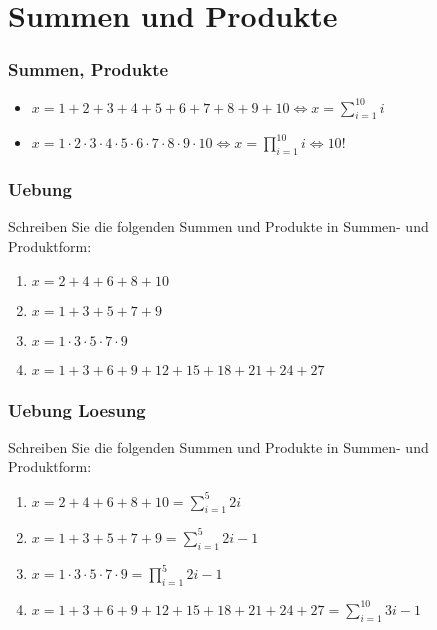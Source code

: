 \section{Summen und Produkte}
\begin{frame}
    \frametitle{Summen, Produkte}
    \begin{itemize}
        \item $x = 1+2+3+4+5+6+7+8+9+10 \iff x = \sum_{i=1}^{10} i$
        \item $x = 1 \cdot 2 \cdot 3 \cdot 4 \cdot 5 \cdot 6 \cdot 7 \cdot 8 \cdot 9 \cdot 10 \iff x = \prod_{i=1}^{10} i \iff 10!$
    \end{itemize}
\end{frame}

\begin{frame}
    \frametitle{Uebung}
    Schreiben Sie die folgenden Summen und Produkte in Summen- und Produktform:
    \begin{enumerate}
        \item $x = 2+4+6+8+10$
        \item $x = 1+3+5+7+9$
        \item $x = 1 \cdot 3 \cdot 5 \cdot 7 \cdot 9$
        \item $x = 1+3+6+9+12+15+18+21+24+27$
    \end{enumerate}
\end{frame}

\begin{frame}
    \frametitle{Uebung Loesung}
    Schreiben Sie die folgenden Summen und Produkte in Summen- und Produktform:
    \begin{enumerate}
        \item $x = 2+4+6+8+10 = \sum_{i=1}^{5} 2i$
        \item $x = 1+3+5+7+9 = \sum_{i=1}^{5} 2i-1$
        \item $x = 1 \cdot 3 \cdot 5 \cdot 7 \cdot 9 = \prod_{i=1}^{5} 2i-1$
        \item $x = 1+3+6+9+12+15+18+21+24+27 = \sum_{i=1}^{10} 3i-1$
    \end{enumerate}
\end{frame}
